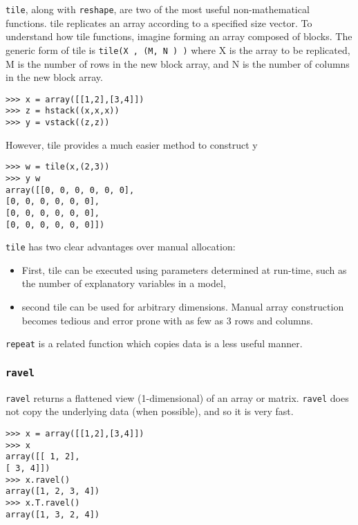 \documentclass[KSmain.tex]{subfiles}
\begin{document}
\texttt{tile}, along with \texttt{reshape}, are two of the most useful non-mathematical functions. tile replicates an array
according to a specified size vector. To understand how tile functions, imagine forming an array composed
of blocks. The generic form of tile is \texttt{tile(X , (M, N ) )} where X is the array to be replicated, M is
the number of rows in the new block array, and N is the number of columns in the new block array. 
%
\begin{framed}
\begin{verbatim}
>>> x = array([[1,2],[3,4]])
>>> z = hstack((x,x,x))
>>> y = vstack((z,z))
\end{verbatim}
\end{framed}
However, tile provides a much easier method to construct y
\begin{framed}
\begin{verbatim}
>>> w = tile(x,(2,3))
>>> y w
array([[0, 0, 0, 0, 0, 0],
[0, 0, 0, 0, 0, 0],
[0, 0, 0, 0, 0, 0],
[0, 0, 0, 0, 0, 0]])
\end{verbatim}
\end{framed}
\texttt{tile} has two clear advantages over manual allocation: 
\begin{itemize} 
\item First, tile can be executed using parameters determined
at run-time, such as the number of explanatory variables in a model,
\item second tile can be
used for arbitrary dimensions. Manual array construction becomes tedious and error prone with as few
as 3 rows and columns. 
\end{itemize}
\texttt{repeat} is a related function which copies data is a less useful manner.

\subsubsection{\texttt{ravel}}
\texttt{ravel} returns a flattened view (1-dimensional) of an array or matrix. \texttt{ravel} does not copy the underlying
data (when possible), and so it is very fast.
\begin{framed}
\begin{verbatim}
>>> x = array([[1,2],[3,4]])
>>> x
array([[ 1, 2],
[ 3, 4]])
>>> x.ravel()
array([1, 2, 3, 4])
>>> x.T.ravel()
array([1, 3, 2, 4])
\end{verbatim}
\end{framed}
\end{document}
